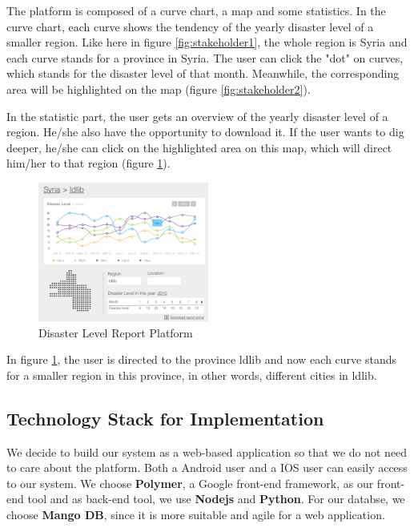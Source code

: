 The platform is composed of a curve chart,
a map and some statistics.
In the curve chart,
each curve shows the tendency of the yearly disaster level of a smaller region.
Like here in figure \ref{fig:stakeholder1}, 
the whole region is Syria and each curve stands for a province in Syria.
The user can click the "dot" on curves,
which stands for the disaster level of that month.
Meanwhile, the corresponding area will be highlighted on the map (figure \ref{fig:stakeholder2}).

In the statistic part,
the user gets an overview of the yearly disaster level of a region.
He/she also have the opportunity to download it.
If the user wants to dig deeper, 
he/she can click on the highlighted area on this map,
which will direct him/her to that region (figure \ref{fig:stakeholder3}).

\begin{figure}[H]
\centering
\includegraphics[width=0.5\textwidth]{figures/function-stakeholder-3}
\caption{Disaster Level Report Platform}
\label{fig:stakeholder3}
\end{figure}

In figure \ref{fig:stakeholder3},
the user is directed to the province ldlib and now each curve stands for a smaller region in this province,
in other words, different cities in ldlib.
    
\subsection{Technology Stack for Implementation}

We decide to build our system as a web-based application so that we do not need to care about the platform.
Both a Android user and a IOS user can easily access to our system. We choose \textbf{Polymer}, 
a Google front-end framework, as our front-end tool and as back-end tool, we use \textbf{Nodejs} and \textbf{Python}. 
For our databse, we choose \textbf{Mango DB}, since it is more suitable and agile for a web application.